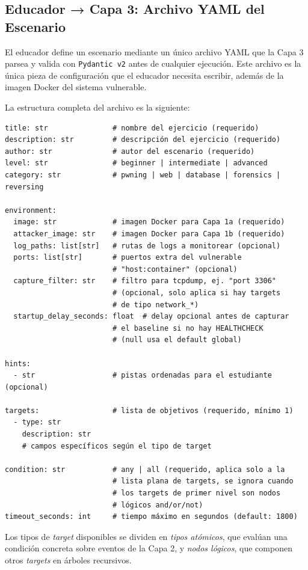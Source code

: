 \subsection{Educador → Capa 3: Archivo YAML del Escenario}

El educador define un escenario mediante un único archivo YAML que la Capa 3
parsea y valida con \texttt{Pydantic v2} antes de cualquier ejecución. Este
archivo es la
única pieza de configuración que el educador necesita escribir, además de la
imagen Docker del sistema vulnerable.

La estructura completa del archivo es la siguiente:

\begin{verbatim}
title: str               # nombre del ejercicio (requerido)
description: str         # descripción del ejercicio (requerido)
author: str              # autor del escenario (requerido)
level: str               # beginner | intermediate | advanced
category: str            # pwning | web | database | forensics | reversing

environment:
  image: str             # imagen Docker para Capa 1a (requerido)
  attacker_image: str    # imagen Docker para Capa 1b (requerido)
  log_paths: list[str]   # rutas de logs a monitorear (opcional)
  ports: list[str]       # puertos extra del vulnerable
                         # "host:container" (opcional)
  capture_filter: str    # filtro para tcpdump, ej. "port 3306"
                         # (opcional, solo aplica si hay targets
                         # de tipo network_*)
  startup_delay_seconds: float  # delay opcional antes de capturar
                         # el baseline si no hay HEALTHCHECK
                         # (null usa el default global)

hints:
  - str                  # pistas ordenadas para el estudiante (opcional)

targets:                 # lista de objetivos (requerido, mínimo 1)
  - type: str
    description: str
    # campos específicos según el tipo de target

condition: str           # any | all (requerido, aplica solo a la
                         # lista plana de targets, se ignora cuando
                         # los targets de primer nivel son nodos
                         # lógicos and/or/not)
timeout_seconds: int     # tiempo máximo en segundos (default: 1800)
\end{verbatim}

Los tipos de \textit{target} disponibles se dividen en \emph{tipos atómicos},
que evalúan una condición concreta sobre eventos de la Capa 2, y \emph{nodos
lógicos}, que componen otros \textit{targets} en árboles recursivos.

